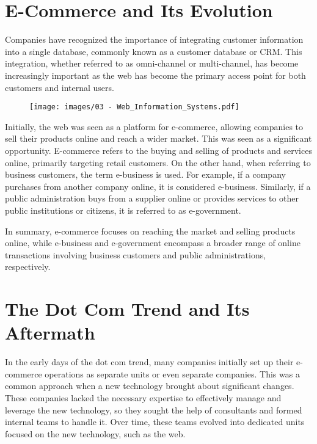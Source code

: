 \section{E-Commerce and Its
  Evolution}\label{e-commerce-and-its-evolution}

Companies have recognized the importance of integrating customer
information into a single database, commonly known as a customer
database or CRM. This integration, whether referred to as omni-channel
or multi-channel, has become increasingly important as the web has
become the primary access point for both customers and internal users.

\begin{figure}[!h]
  \centering
  \texttt{[image: images/03 - Web\_Information\_Systems.pdf]}
\end{figure}

Initially, the web was seen as a platform for e-commerce, allowing
companies to sell their products online and reach a wider market. This
was seen as a significant opportunity. E-commerce refers to the buying
and selling of products and services online, primarily targeting retail
customers. On the other hand, when referring to business customers, the
term e-business is used. For example, if a company purchases from
another company online, it is considered e-business. Similarly, if a
public administration buys from a supplier online or provides services
to other public institutions or citizens, it is referred to as
e-government.

In summary, e-commerce focuses on reaching the market and selling
products online, while e-business and e-government encompass a broader
range of online transactions involving business customers and public
administrations, respectively.

\section{The Dot Com Trend and Its
  Aftermath}\label{the-dot-com-trend-and-its-aftermath}

In the early days of the dot com trend, many companies initially set up
their e-commerce operations as separate units or even separate
companies. This was a common approach when a new technology brought
about significant changes. These companies lacked the necessary
expertise to effectively manage and leverage the new technology, so they
sought the help of consultants and formed internal teams to handle it.
Over time, these teams evolved into dedicated units focused on the new
technology, such as the web.

